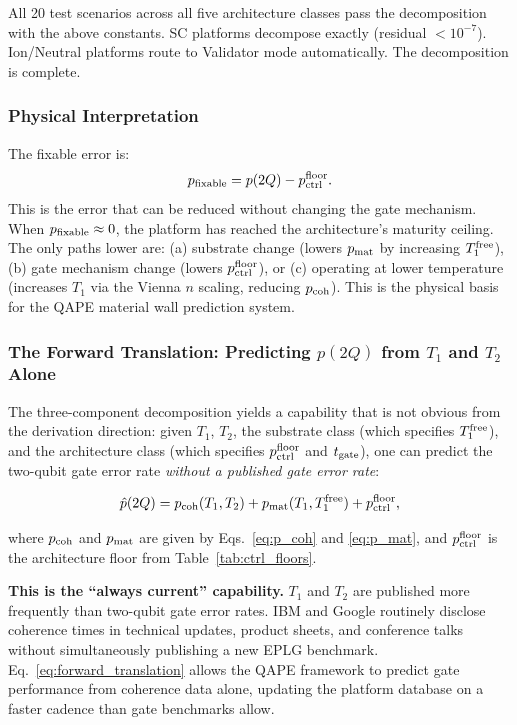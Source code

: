 \documentclass[12pt,a4paper]{article}
\begin{document}
All 20 test scenarios across all five architecture classes pass the
decomposition with the above constants. SC platforms decompose exactly
(residual $< 10^{-7}$). Ion/Neutral platforms route to Validator mode
automatically. The decomposition is complete.

\subsubsection{Physical Interpretation}

The fixable error is:
\begin{equation}
p_{\rm fixable} = p(2Q) - p_{\rm ctrl}^{\rm floor}.
\end{equation}
This is the error that can be reduced without changing the gate mechanism.
When $p_{\rm fixable} \approx 0$, the platform has reached the architecture's
maturity ceiling. The only paths lower are: (a) substrate change (lowers
$p_{\rm mat}$ by increasing $T_1^{\rm free}$), (b) gate mechanism change
(lowers $p_{\rm ctrl}^{\rm floor}$), or (c) operating at lower temperature
(increases $T_1$ via the Vienna $n$ scaling, reducing $p_{\rm coh}$).
This is the physical basis for the QAPE material wall prediction system.

\subsubsection{The Forward Translation: Predicting $p(2Q)$ from $T_1$ and $T_2$ Alone}
\label{sec:forward_translation}

The three-component decomposition yields a capability that is not obvious from
the derivation direction: given $T_1$, $T_2$, the substrate class (which
specifies $T_1^{\rm free}$), and the architecture class (which specifies
$p_{\rm ctrl}^{\rm floor}$ and $t_{\rm gate}$), one can predict the two-qubit
gate error rate \emph{without a published gate error rate}:

\begin{equation}
\hat{p}(2Q) = p_{\rm coh}(T_1, T_2) + p_{\rm mat}(T_1, T_1^{\rm free}) +
p_{\rm ctrl}^{\rm floor},
\label{eq:forward_translation}
\end{equation}

where $p_{\rm coh}$ and $p_{\rm mat}$ are given by Eqs.~\eqref{eq:p_coh}
and \eqref{eq:p_mat}, and $p_{\rm ctrl}^{\rm floor}$ is the architecture
floor from Table~\ref{tab:ctrl_floors}.

\textbf{This is the ``always current'' capability.}
$T_1$ and $T_2$ are published more frequently than two-qubit gate error rates.
IBM and Google routinely disclose coherence times in technical updates, product
sheets, and conference talks without simultaneously publishing a new EPLG
benchmark. Eq.~\eqref{eq:forward_translation} allows the QAPE framework to
predict gate performance from coherence data alone, updating the platform
database on a faster cadence than gate benchmarks allow.
\end{document}
